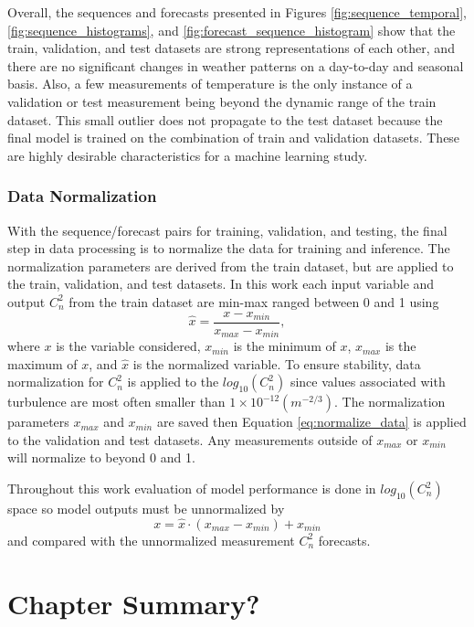 Overall, the sequences and forecasts presented in Figures \ref{fig:sequence_temporal}, \ref{fig:sequence_histograms}, and \ref{fig:forecast_sequence_histogram} show that the train, validation, and test datasets are strong representations of each other, and there are no significant changes in weather patterns on a day-to-day and seasonal basis. Also, a few measurements of temperature is the only instance of a validation or test measurement being beyond the dynamic range of the train dataset. This small outlier does not propagate to the test dataset because the final model is trained on the combination of train and validation datasets. These are highly desirable characteristics for a machine learning study.


\subsubsection{Data Normalization}
With the sequence/forecast pairs for training, validation, and testing, the final step in data processing is to normalize the data for training and inference. The normalization parameters are derived from the train dataset, but are applied to the train, validation, and test datasets. In this work each input variable and output $C_{n}^{2}$ from the train dataset are min-max ranged between 0 and 1 using
\begin{equation} \label{eq:normalize_data}
	\hat{x} = \frac{x - x_{min}}{x_{max} - x_{min}},
\end{equation}
where $x$ is the variable considered, $x_{min}$ is the minimum of $x$, $x_{max}$ is the maximum of $x$, and $\hat{x}$ is the normalized variable. To ensure stability, data normalization for $C_{n}^{2}$ is applied to the $log_{10}(C_{n}^{2})$ since values associated with turbulence are most often smaller than $1 \times 10^{-12} (m^{-2/3})$. The normalization parameters $x_{max}$ and $x_{min}$ are saved then Equation \ref{eq:normalize_data} is applied to the validation and test datasets. Any measurements outside of $x_{max}$ or $x_{min}$ will normalize to beyond 0 and 1.

Throughout this work evaluation of model performance is done in $log_{10}(C_{n}^{2})$ space so model outputs must be unnormalized by
\begin{equation} \label{eq:unnormalize_data}
	x = \hat{x} \cdot \left(x_{max} - x_{min}\right) + x_{min}
\end{equation}
and compared with the unnormalized measurement $C_{n}^{2}$ forecasts.

\section{Chapter Summary?}